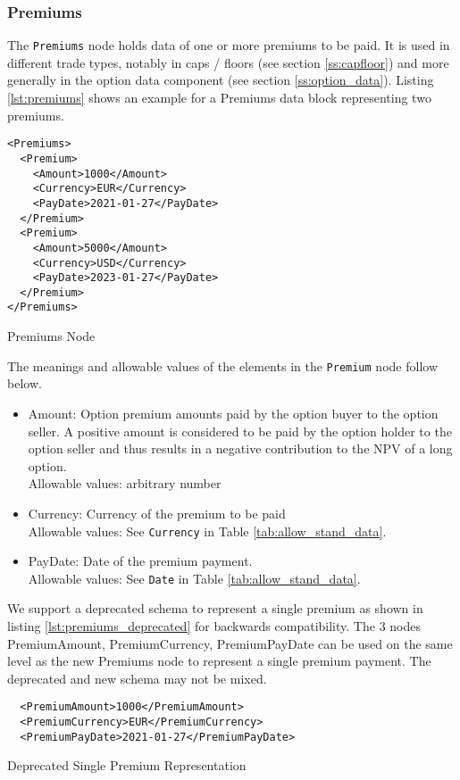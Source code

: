 \subsubsection{Premiums}
\label{ss:premiums}

The \lstinline!Premiums! node holds data of one or more premiums to be paid. It is used in different trade types,
notably in caps / floors (see section \ref{ss:capfloor}) and more generally in the option data component (see section
\ref{ss:option_data}). Listing \ref{lst:premiums} shows an example for a Premiums data block representing two premiums.

\begin{listing}[H]
\begin{verbatim}
<Premiums>
  <Premium>
    <Amount>1000</Amount>
    <Currency>EUR</Currency>
    <PayDate>2021-01-27</PayDate>
  </Premium>
  <Premium>
    <Amount>5000</Amount>
    <Currency>USD</Currency>
    <PayDate>2023-01-27</PayDate>
  </Premium>
</Premiums>
\end{verbatim}
\caption{Premiums Node}
\label{lst:premiums}
\end{listing}

The meanings and allowable values of the elements in the \lstinline!Premium! node follow below.

\begin{itemize}
\item Amount: Option premium amounts paid by the option buyer to the option seller. A positive amount is considered to be paid by the option holder to the option seller and thus results in a negative contribution to the NPV of a long option.\\
  Allowable values: arbitrary number
\item Currency: Currency of the premium to be paid\\
  Allowable values:  See \lstinline!Currency! in Table \ref{tab:allow_stand_data}.
\item PayDate: Date of the premium payment.\\
  Allowable values:  See \lstinline!Date! in Table \ref{tab:allow_stand_data}.
\end{itemize}

We support a deprecated schema to represent a single premium as shown in listing \ref{lst:premiums_deprecated} for
backwards compatibility. The $3$ nodes PremiumAmount, PremiumCurrency, PremiumPayDate can be used on the same level as
the new Premiums node to represent a single premium payment. The deprecated and new schema may not be mixed.

\begin{listing}[H]
\begin{verbatim}
  <PremiumAmount>1000</PremiumAmount>
  <PremiumCurrency>EUR</PremiumCurrency>
  <PremiumPayDate>2021-01-27</PremiumPayDate>
\end{verbatim}
\caption{Deprecated Single Premium Representation}
\label{lst:premiums_deprecated}
\end{listing}
